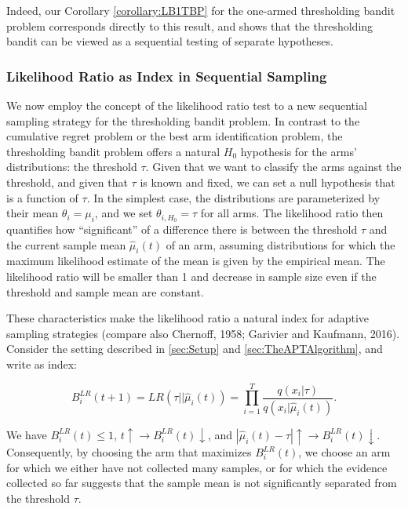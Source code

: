 \documentclass[11pt,]{article}
\begin{document}
Indeed, our Corollary \autoref{corollary:LB1TBP} for the one-armed
thresholding bandit problem corresponds directly to this result, and
shows that the thresholding bandit can be viewed as a sequential testing
of separate hypotheses.

\subsubsection{\texorpdfstring{Likelihood Ratio as Index in Sequential
Sampling
\label{sec:LRasIndex}}{Likelihood Ratio as Index in Sequential Sampling }}\label{likelihood-ratio-as-index-in-sequential-sampling}

We now employ the concept of the likelihood ratio test to a new
sequential sampling strategy for the thresholding bandit problem. In
contrast to the cumulative regret problem or the best arm identification
problem, the thresholding bandit problem offers a natural \(H_0\)
hypothesis for the arms' distributions: the threshold \(\tau\). Given
that we want to classify the arms against the threshold, and given that
\(\tau\) is known and fixed, we can set a null hypothesis that is a
function of \(\tau\). In the simplest case, the distributions are
parameterized by their mean \(\theta_i = \mu_i\), and we set
\(\theta_{i,H_0} = \tau\) for all arms. The likelihood ratio then
quantifies how ``significant'' of a difference there is between the
threshold \(\tau\) and the current sample mean \(\hat{\mu}_i(t)\) of an
arm, assuming distributions for which the maximum likelihood estimate of
the mean is given by the empirical mean. The likelihood ratio will be
smaller than 1 and decrease in sample size even if the threshold and
sample mean are constant.

These characteristics make the likelihood ratio a natural index for
adaptive sampling strategies (compare also Chernoff, 1958; Garivier and
Kaufmann, 2016). Consider the setting described in \autoref{sec:Setup}
and \autoref{sec:TheAPTAlgorithm}, and write as index:

\[
B_i^{LR}(t+1) = LR(\tau|| \hat{\mu}_i(t)) = \prod_{i=1}^T\frac{q(x_i|\tau)}{ q(x_i|\hat{\mu}_i(t))}.
\]

We have \(B_i^{LR}(t) \leq 1\),
\(t \uparrow \rightarrow B_i^{LR}(t) \downarrow\), and
\(|\hat{\mu}_i(t) - \tau| \uparrow \rightarrow B_i^{LR}(t) \downarrow\).
Consequently, by choosing the arm that maximizes \(B_i^{LR}(t)\), we
choose an arm for which we either have not collected many samples, or
for which the evidence collected so far suggests that the sample mean is
not significantly separated from the threshold \(\tau\).
\end{document}
